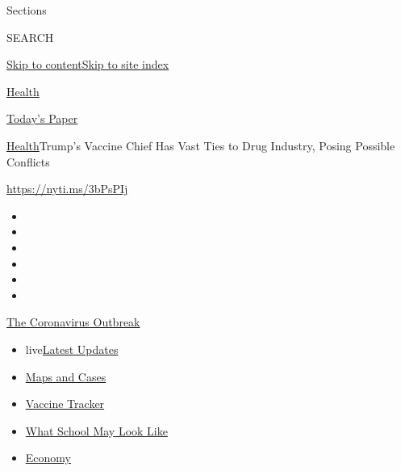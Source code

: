 Sections

SEARCH

\protect\hyperlink{site-content}{Skip to
content}\protect\hyperlink{site-index}{Skip to site index}

\href{https://www.nytimes3xbfgragh.onion/section/health}{Health}

\href{https://myaccount.nytimes3xbfgragh.onion/auth/login?response_type=cookie\&client_id=vi}{}

\href{https://www.nytimes3xbfgragh.onion/section/todayspaper}{Today's
Paper}

\href{/section/health}{Health}\textbar{}Trump's Vaccine Chief Has Vast
Ties to Drug Industry, Posing Possible Conflicts

\url{https://nyti.ms/3bPsPIj}

\begin{itemize}
\item
\item
\item
\item
\item
\item
\end{itemize}

\href{https://www.nytimes3xbfgragh.onion/news-event/coronavirus?action=click\&pgtype=Article\&state=default\&region=TOP_BANNER\&context=storylines_menu}{The
Coronavirus Outbreak}

\begin{itemize}
\tightlist
\item
  live\href{https://www.nytimes3xbfgragh.onion/2020/08/02/world/coronavirus-updates.html?action=click\&pgtype=Article\&state=default\&region=TOP_BANNER\&context=storylines_menu}{Latest
  Updates}
\item
  \href{https://www.nytimes3xbfgragh.onion/interactive/2020/us/coronavirus-us-cases.html?action=click\&pgtype=Article\&state=default\&region=TOP_BANNER\&context=storylines_menu}{Maps
  and Cases}
\item
  \href{https://www.nytimes3xbfgragh.onion/interactive/2020/science/coronavirus-vaccine-tracker.html?action=click\&pgtype=Article\&state=default\&region=TOP_BANNER\&context=storylines_menu}{Vaccine
  Tracker}
\item
  \href{https://www.nytimes3xbfgragh.onion/interactive/2020/07/29/us/schools-reopening-coronavirus.html?action=click\&pgtype=Article\&state=default\&region=TOP_BANNER\&context=storylines_menu}{What
  School May Look Like}
\item
  \href{https://www.nytimes3xbfgragh.onion/live/2020/07/31/business/stock-market-today-coronavirus?action=click\&pgtype=Article\&state=default\&region=TOP_BANNER\&context=storylines_menu}{Economy}
\end{itemize}

